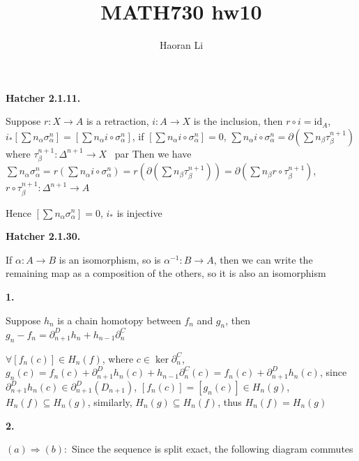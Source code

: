 \documentclass[12pt]{article}
\title{MATH730 hw10}
\author{Haoran Li}
\date{}
\begin{document}
\maketitle
\textbf{Hatcher 2.1.11.} \par
Suppose $r:X\rightarrow A$ is a retraction, $i: A\rightarrow X$ is the inclusion, then $r\circ i=\mathrm{id}_A$, $i_*[\sum n_\alpha\sigma^n_\alpha]=[\sum n_\alpha i\circ\sigma^n_\alpha]$, if $[\sum n_\alpha i\circ\sigma^n_\alpha]=0$, $\sum n_\alpha i\circ\sigma^n_\alpha=\partial\left(\sum n_\beta \tau^{n+1}_\beta\right)$ where $\tau^{n+1}_\beta:\Delta^{n+1}\rightarrow X$ \ par
Then we have $\sum n_\alpha\sigma^n_\alpha=r\left(\sum n_\alpha i\circ\sigma^n_\alpha\right)=r\left(\partial\left(\sum n_\beta \tau^{n+1}_\beta\right)\right)=\partial\left(\sum n_\beta r\circ\tau^{n+1}_\beta\right)$, $r\circ\tau^{n+1}_\beta:\Delta^{n+1}\rightarrow A$ \par
Hence $[\sum n_\alpha\sigma^n_\alpha]=0$, $i_*$ is injective \par
\textbf{Hatcher 2.1.30.} \par
If $\alpha:A\rightarrow B$ is an isomorphism, so is $\alpha^{-1}:B\rightarrow A$, then we can write the remaining map as a composition of the others, so it is also an isomorphism \par
\textbf{1.} \par
Suppose $h_n$ is a chain homotopy between $f_n$ and $g_n$, then $g_n-f_n=\partial^D_{n+1}h_n+h_{n-1}\partial^C_n$ \par
$\forall [f_n(c)]\in H_n(f)$, where $c\in\ker\partial^C_n$, $g_n(c)=f_n(c)+\partial^D_{n+1}h_n(c)+h_{n-1}\partial^C_n(c)=f_n(c)+\partial^D_{n+1}h_n(c)$, since $\partial^D_{n+1}h_n(c)\in\partial^D_{n+1}(D_{n+1})$, $[f_n(c)]=[g_n(c)]\in H_n(g)$, $H_n(f)\subseteq H_n(g)$, similarly, $H_n(g)\subseteq H_n(f)$, thus $H_n(f)= H_n(g)$ \par
\textbf{2.} \par
$(a)\Rightarrow (b):$ Since the sequence is split exact, the following diagram commutes \par
\begin{center}
\end{center}
\end{document}
